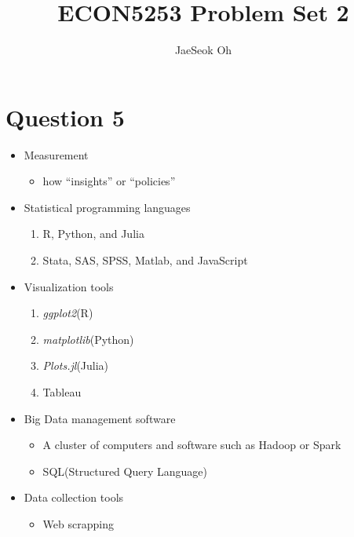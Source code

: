 \documentclass{article}
\title{ECON5253 Problem Set 2}
\author{JaeSeok Oh}
\begin{document}
	\maketitle
	
	
	\section*{Question 5}
	
	\begin{itemize}
		\item Measurement
		\begin{itemize}
			\item how ``insights'' or ``policies''
		\end{itemize}
		\item Statistical programming languages
		\begin{enumerate}
			\item R, Python, and Julia
			\item Stata, SAS, SPSS, Matlab, and JavaScript
		\end{enumerate}
		\item Visualization tools
		\begin{enumerate}
			\item \textit{ggplot2}(R)
			\item \textit{matplotlib}(Python)
			\item \textit{Plots.jl}(Julia)
			\item Tableau
		\end{enumerate}
		\item Big Data management software
		\begin{itemize}
			\item A cluster of computers and software such as Hadoop or Spark
			\item SQL(Structured Query Language)
		\end{itemize}
		\item Data collection tools
		\begin{itemize}
			\item Web scrapping
		\end{itemize}
	\end{itemize}
	
	
	
	
	
	
\end{document}

